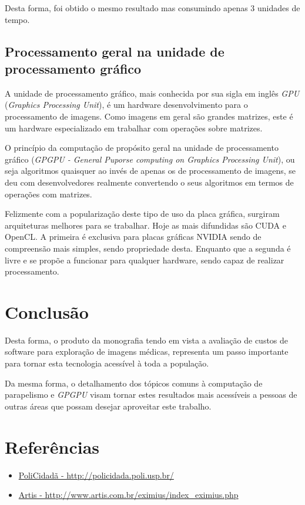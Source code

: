     Desta forma, foi obtido o mesmo resultado mas consumindo apenas 3 unidades de tempo.
  
  \subsection{Processamento geral na unidade de processamento gráfico}
  A unidade de processamento gráfico, mais conhecida por sua sigla em inglês \textit{GPU} (\textit{Graphics Processing Unit}), é um hardware desenvolvimento para o processamento de imagens. Como imagens em geral são grandes matrizes, este é um hardware especializado em trabalhar com operações sobre matrizes.
  
  O princípio da computação de propósito geral na unidade de processamento gráfico (\textit{GPGPU - General Puporse computing on Graphics Processing Unit}), ou seja algoritmos quaisquer ao invés de apenas os de processamento de imagens, se deu com desenvolvedores realmente convertendo o seus algoritmos em termos de operações com matrizes.
  
  Felizmente com a popularização deste tipo de uso da placa gráfica, surgiram arquiteturas melhores para se trabalhar. Hoje as mais difundidas são CUDA e OpenCL. A primeira é exclusiva para placas gráficas NVIDIA sendo de compreensão mais simples, sendo propriedade desta. Enquanto que a segunda é livre e se propõe a funcionar para qualquer hardware, sendo capaz de realizar processamento.

\section{Conclusão}
Desta forma, o produto da monografia tendo em vista a avaliação de custos de software para exploração de imagens médicas, representa um passo importante para tornar esta tecnologia acessível à toda a população.

Da mesma forma, o detalhamento dos tópicos comuns à computação de parapelismo e \textit{GPGPU} visam tornar estes resultados mais acessíveis a pessoas de outras áreas que possam desejar aproveitar este trabalho.

\section{Referências}
\begin{itemize}
  \item\label{policidada} \href{http://policidada.poli.usp.br/}{PoliCidadã - http://policidada.poli.usp.br/}
  \item\label{artis} \href{http://www.artis.com.br/eximius/index\_eximius.php}{Artis - http://www.artis.com.br/eximius/index\_eximius.php}
\end{itemize}
